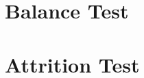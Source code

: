 \documentclass[10pt,a4paper]{article}
\begin{document}
\listoftables

\pagebreak

\section{Balance Test}


%				
%				


	\begin{table}
				
	\end{table}


\section{Attrition Test}
\end{document}
